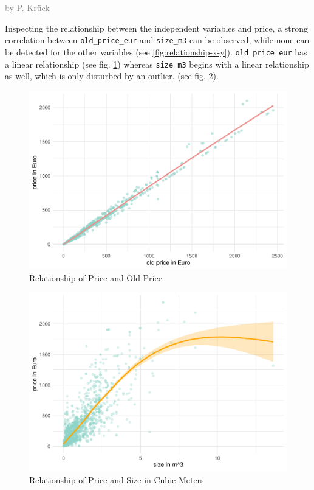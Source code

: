 \documentclass[a4paper, nobind]{templates/ociamthesis}
\begin{document}
\textcolor{gray}{by P. Krück}

Inspecting the relationship between the independent variables and price, a strong correlation between \texttt{old\_price\_eur} and \texttt{size\_m3} can be observed, while none can be detected for the other variables (see \ref{fig:relationship-x-y}).
\texttt{old\_price\_eur} has a linear relationship (see fig. \ref{fig:relationship-old-price}) whereas \texttt{size\_m3} begins with a linear relationship as well, which is only disturbed by an outlier. (see fig. \ref{fig:relationship-size-m3}).

\begin{figure}
\includegraphics[width=1\linewidth]{_main_files/figure-latex/relationship-old-price-1} \caption{Relationship of Price and Old Price}\label{fig:relationship-old-price}
\end{figure}

\begin{figure}
\includegraphics[width=1\linewidth]{_main_files/figure-latex/relationship-size-m3-1} \caption{Relationship of Price and Size in Cubic Meters}\label{fig:relationship-size-m3}
\end{figure}
\end{document}
